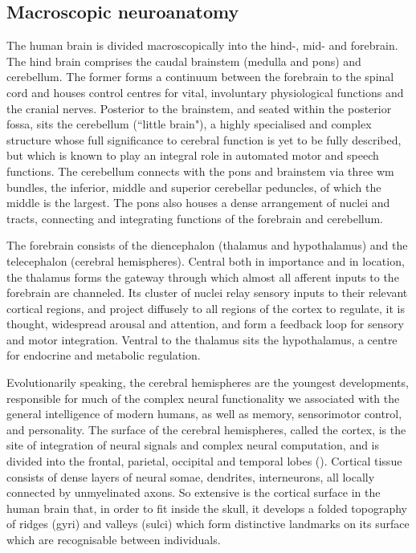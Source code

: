 \subsection{Macroscopic neuroanatomy}

The human brain is divided macroscopically into the hind-, mid- and forebrain.
The hind brain comprises the caudal brainstem (medulla and pons) and cerebellum.
The former forms a continuum between the forebrain to the spinal cord and houses control centres for vital, involuntary physiological functions and the cranial nerves.
Posterior to the brainstem, and seated within the posterior fossa, sits the cerebellum (``little brain"),
a highly specialised and complex structure whose full significance to cerebral function is yet to be fully described, but which is known to play an integral role in automated motor and speech functions.
The cerebellum connects with the pons and brainstem via three \gls{wm} bundles, the inferior, middle and superior cerebellar peduncles, of which the middle is the largest.
The pons also houses a dense arrangement of nuclei and tracts, connecting and integrating functions of the forebrain and cerebellum.

The forebrain consists of the diencephalon (thalamus and hypothalamus) and the telecephalon (cerebral hemispheres).
Central both in importance and in location, the thalamus forms the gateway through which almost all afferent inputs to the forebrain are channeled.
Its cluster of nuclei relay sensory inputs to their relevant cortical regions, and project diffusely to all regions of the cortex to regulate, it is thought, widespread arousal and attention, and form a feedback loop for sensory and motor integration.
Ventral to the thalamus sits the hypothalamus, a centre for endocrine and metabolic regulation.

Evolutionarily speaking, the cerebral hemispheres are the youngest developments, responsible for much of the complex neural functionality we associated with the general intelligence of modern humans, as well as memory, sensorimotor control, and personality.
The surface of the cerebral hemispheres, called the cortex, is the site of integration of neural signals and complex neural computation, and is divided into the frontal, parietal, occipital and temporal lobes ().
Cortical tissue consists of dense layers of neural somae, dendrites, interneurons, all locally connected by unmyelinated axons.
So extensive is the cortical surface in the human brain that, in order to fit inside the skull, it develops a folded topography of ridges (gyri) and valleys (sulci) which form distinctive landmarks on its surface which are recognisable between individuals.

